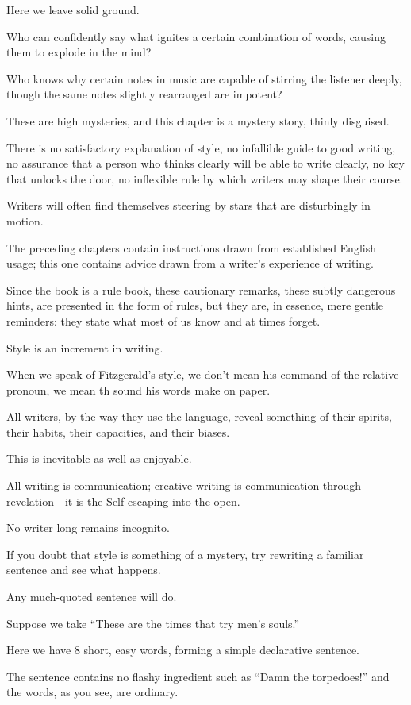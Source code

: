 \documentclass{book}
\numberwithin{equation}{section}
\begin{document}
Here we leave solid ground.

Who can confidently say what ignites a certain combination of words, causing them to explode in the mind?

Who knows why certain notes in music are capable of stirring the listener deeply, though the same notes slightly rearranged are impotent?

These are high mysteries, and this chapter is a mystery story, thinly disguised.

There is no satisfactory explanation of style, no infallible guide to good writing, no assurance that a person who thinks clearly will be able to write clearly, no key that unlocks the door, no inflexible rule by which writers may shape their course.

Writers will often find themselves steering by stars that are disturbingly in motion.

%
The preceding chapters contain instructions drawn from established English usage; this one contains advice drawn from a writer's experience of writing.

Since the book is a rule book, these cautionary remarks, these subtly dangerous hints, are presented in the form of rules, but they are, in essence, mere gentle reminders: they state what most of us know and at times forget.

%
Style is an increment in writing.

When we speak of Fitzgerald's style, we don't mean his command of the relative pronoun, we mean th sound his words make on paper.

All writers, by the way they use the language, reveal something of their spirits, their habits, their capacities, and their biases.

This is inevitable as well as enjoyable.

All writing is communication; creative writing is communication through revelation - it is the Self escaping into the open.

No writer long remains incognito.

%
If you doubt that style is something of a mystery, try rewriting a familiar sentence and see what happens.

Any much-quoted sentence will do.

Suppose we take ``These are the times that try men's souls.''

Here we have 8 short, easy words, forming a simple declarative sentence.

The sentence contains no flashy ingredient such as ``Damn the torpedoes!'' and the words, as you see, are ordinary.
\end{document}
